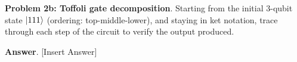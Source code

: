 \textbf{Problem 2b: Toffoli gate decomposition}. Starting from the initial 3-qubit state $\ket{111}$ (ordering: top-middle-lower), and staying in ket
notation, trace through each step of the circuit to verify the output produced.


\textbf{Answer}. [Insert Answer]


